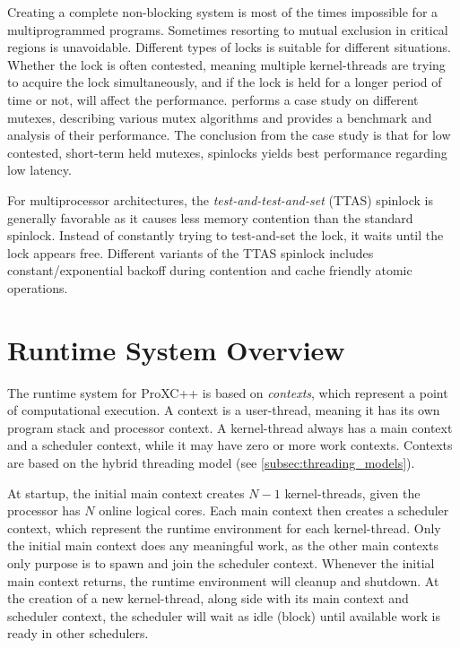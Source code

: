 Creating a complete non\hyp{}blocking system is most of the times impossible for a multiprogrammed programs. Sometimes resorting to mutual exclusion in critical regions is unavoidable. Different types of locks is suitable for different situations. Whether the lock is often contested, meaning multiple kernel\hyp{}threads are trying to acquire the lock simultaneously, and if the lock is held for a longer period of time or not, will affect the performance.  performs a case study on different mutexes, describing various mutex algorithms and provides a benchmark and analysis of their performance. The conclusion from the case study is that for low contested, short\hyp{}term held mutexes, spinlocks yields best performance regarding low latency. 

For multiprocessor architectures, the \textit{test\hyp{}and\hyp{}test\hyp{}and\hyp{}set} (TTAS) spinlock is generally favorable as it causes less memory contention than the standard spinlock. Instead of constantly trying to test\hyp{}and\hyp{}set the lock, it waits until the lock appears free. Different variants of the TTAS spinlock includes constant/exponential backoff during contention and cache friendly atomic operations.


\FloatBarrier
\section{Runtime System Overview}
\label{sec:runtime_system_overview}

The runtime system for ProXC++ is based on \textit{contexts}, which represent a point of computational execution. A context is a user\hyp{}thread, meaning it has its own program stack and processor context. A kernel\hyp{}thread always has a main context and a scheduler context, while it may have zero or more work contexts. Contexts are based on the hybrid threading model (see \cref{subsec:threading_models}).

At startup, the initial main context creates $N-1$ kernel\hyp{}threads, given the processor has $N$ online logical cores. Each main context then creates a scheduler context, which represent the runtime environment for each kernel\hyp{}thread. Only the initial main context does any meaningful work, as the other main contexts only purpose is to spawn and join the scheduler context. Whenever the initial main context returns, the runtime environment will cleanup and shutdown. At the creation of a new kernel\hyp{}thread, along side with its main context and scheduler context, the scheduler will wait as idle (block) until available work is ready in other schedulers.

